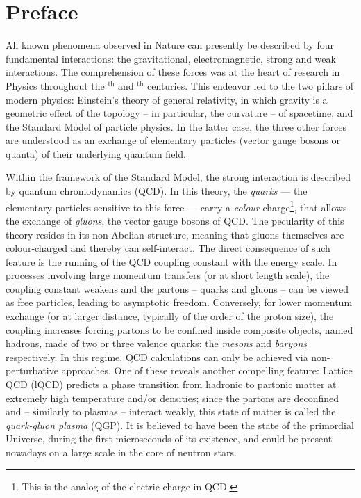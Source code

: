 \chapter{Preface}
\label{chap:Chapter1}

All known phenomena observed in Nature can presently be described by four fundamental interactions: the gravitational, electromagnetic, strong and weak interactions. The comprehension of these forces was at the heart of research in Physics throughout the $^{\textrm{th}}$ and $^{\textrm{th}}$ centuries. This endeavor led to the two pillars of modern physics: Einstein's theory of general relativity, in which gravity is a geometric effect of the topology -- in particular, the curvature -- of spacetime, and the Standard Model of particle physics. In the latter case, the three other forces are understood as an exchange of elementary particles (vector gauge bosons or quanta) of their underlying quantum field.

Within the framework of the Standard Model, the strong interaction is described by quantum chromodynamics (QCD). In this theory, the \textit{quarks} --- the elementary particles sensitive to this force --- carry a \textit{colour} charge\footnote{This is the analog of the electric charge in QCD.}, that allows the exchange of \textit{gluons}, the vector gauge bosons of QCD. The pecularity of this theory resides in its non-Abelian structure, meaning that gluons themselves are colour-charged and thereby can self-interact. The direct consequence of such feature is the running of the QCD coupling constant with the energy scale. In processes involving large momentum transfers (or at short length scale), the coupling constant weakens and the partons -- quarks and gluons -- can be viewed as free particles, leading to asymptotic freedom. Conversely, for lower momentum exchange (or at larger distance, typically of the order of the proton size), the coupling increases forcing partons to be confined inside composite objects, named hadrons, made of two or three valence quarks: the \textit{mesons} and \textit{baryons} respectively. In this regime, QCD calculations can only be achieved via non-perturbative approaches. One of these reveals another compelling feature: Lattice QCD (lQCD) predicts a phase transition from hadronic to partonic matter at extremely high temperature and/or densities; since the partons are deconfined and -- similarly to plasmas -- interact weakly, this state of matter is called the \textit{quark-gluon plasma} (QGP). It is believed to have been the state of the primordial Universe, during the first microseconds of its existence, and could be present nowadays on a large scale in the core of neutron stars. \\

